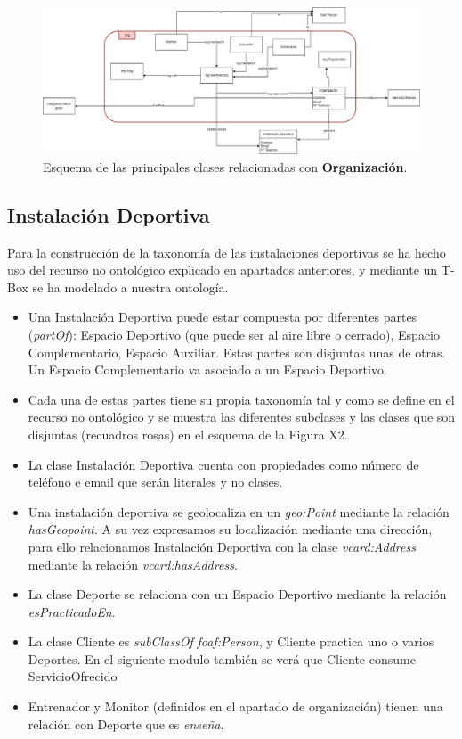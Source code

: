 \documentclass[a4paper,12pt]{article}
\begin{document}
	\begin{figure}[H]
		\centering
		\includegraphics[width=\textwidth]{include/org.jpg}
		\caption{Esquema de las principales clases relacionadas con \textbf{Organización}.}
	\end{figure}
	
	\subsection{Instalación Deportiva}
	
	Para la construcción de la taxonomía de las instalaciones deportivas se ha hecho uso del recurso
no ontológico explicado en apartados anteriores, y mediante un T-Box se ha modelado a nuestra
ontología.
	
	\begin{itemize}
		\item Una Instalación Deportiva puede estar compuesta por diferentes partes (\textit{partOf}):
Espacio Deportivo (que puede ser al aire libre o cerrado), Espacio Complementario,
Espacio Auxiliar. Estas partes son disjuntas unas de otras. Un Espacio
Complementario va asociado a un Espacio Deportivo.
		\item Cada una de estas partes tiene su propia taxonomía tal y como se define en el recurso no
	ontológico y se muestra las diferentes subclases y las clases que son disjuntas (recuadros
rosas) en el esquema de la Figura X2.
		\item La clase Instalación Deportiva cuenta con propiedades como número de teléfono e email que
serán literales y no clases.
		\item Una instalación deportiva se geolocaliza en un \textit{geo:Point} mediante la relación
\textit{hasGeopoint}. A su vez expresamos su localización mediante una dirección, para ello
relacionamos Instalación Deportiva con la clase \textit{vcard:Address} mediante la relación
\textit{vcard:hasAddress}.
		\item La clase Deporte se relaciona con un Espacio Deportivo mediante la relación
\textit{esPracticadoEn}.
		\item La clase Cliente es \textit{subClassOf} \textit{foaf:Person}, y Cliente practica uno o varios Deportes.
En el siguiente modulo también se verá que Cliente consume ServicioOfrecido
		\item Entrenador y Monitor (definidos en el apartado de organización) tienen una relación
	con Deporte que es \textit{enseña}.
	\end{itemize}
\end{document}
